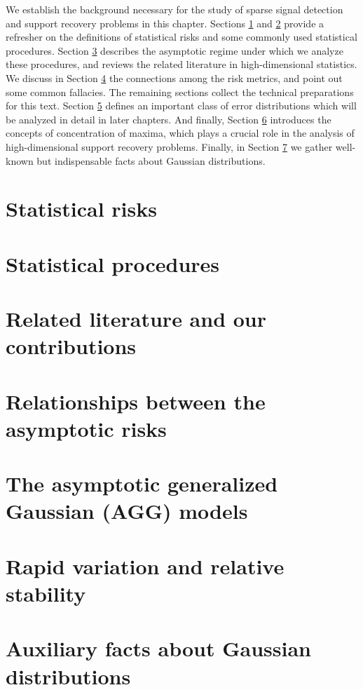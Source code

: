 
We establish the background necessary for the study of sparse signal detection and support recovery problems in this chapter.
Sections \ref{sec:risks} and \ref{sec:statistical-procedures} provide a refresher on the definitions of statistical risks and some commonly used statistical procedures.
Section \ref{sec:asymptotics} describes the asymptotic regime under which we analyze these procedures, and reviews the related literature in high-dimensional statistics.
We discuss in Section \ref{sec:risks-relations} the connections among the risk metrics, and point out some common fallacies.
The remaining sections collect the technical preparations for this text.
Section \ref{suppsec:AGG} defines an important class of error distributions which will be analyzed in detail in later chapters. 
And finally, Section \ref{subsec:RS} introduces the concepts of concentration of maxima, which plays a crucial role in the analysis of high-dimensional support recovery problems.  Finally, in Section \ref{sec:Gaussian} we gather well-known but indispensable facts about Gaussian distributions.


\section{Statistical risks}
\label{sec:risks}


\section{Statistical procedures}
\label{sec:statistical-procedures}


\section{Related literature and our contributions}
\label{sec:asymptotics}


\section{Relationships between the asymptotic risks}
\label{sec:risks-relations}


\section{The asymptotic generalized Gaussian (AGG) models}
\label{suppsec:AGG}


\section{Rapid variation and relative stability}
\label{subsec:RS}


\section{Auxiliary facts about Gaussian distributions}
 \label{sec:Gaussian}
 